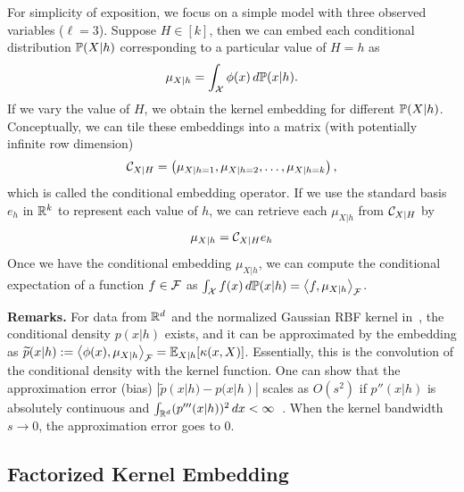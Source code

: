 \documentclass{article}
\begin{document}
For simplicity of exposition, we focus on a simple model with three observed variables ($\ell=3$). Suppose $H\in[k]$, then we can embed each conditional distribution $\mathbb{P}(X|h)$ corresponding to a particular value of $H=h$ as
\begin{align}
  \mu_{X|h} = \int_{\mathcal{X}} \phi(x)\, d \mathbb{P}(x | h).
\end{align}
If we vary the value of $H$, we  obtain the kernel embedding for different $\mathbb{P}(X|h)$. Conceptually, we can tile these embeddings into a matrix (with potentially infinite row dimension)
\begin{align}
  \mathcal{C}_{X|H} = \left(\mu_{X|h=1},\mu_{X|h=2},\ldots,\mu_{X|h=k}\right),
\end{align}
which is called the conditional embedding operator. If we use the standard basis $e_h$ in $\mathbb{R}^k$ to represent each value of $h$, we can retrieve each $\mu_{X|h}$ from $\mathcal{C}_{X|H}$ by
\begin{align}
  \mu_{X|h} = \mathcal{C}_{X|H} e_h
\end{align}
Once we have the conditional embedding $\mu_{X|h}$, we can compute the conditional expectation of a function $f\in \mathcal{F}$ as $\int_{\mathcal{X}} f(x) \,d\mathbb{P}(x|h)  = \left\langle f,\mu_{X|h} \right\rangle_{\mathcal{F}}$.

{\bf Remarks.} For data from $\mathbb{R}^d$ and the normalized Gaussian RBF kernel in~, the conditional density $p(x|h)$ exists, and it can be approximated by the embedding as $\widetilde{p}(x|h) := \left\langle \phi(x),\mu_{X|h} \right\rangle_{\mathcal{F}}=\mathbb{E}_{X|h}[\kappa(x,X)]$. Essentially, this is the convolution of the conditional density with the kernel function. One can show that the approximation error (bias) $|\widetilde{p}(x|h)-p(x|h)|$ scales as $O(s^2)$
if $p''(x|h)$ is absolutely continuous and $\int_{\mathbb{R}^d} (p'''(x|h))^2\,dx < \infty$~\cite{Wasserman06}. When the kernel bandwidth $s \rightarrow 0$, the approximation error goes to 0.

\vspace{-3mm}
\subsection{Factorized Kernel Embedding}
\vspace{-3mm}
\end{document}
